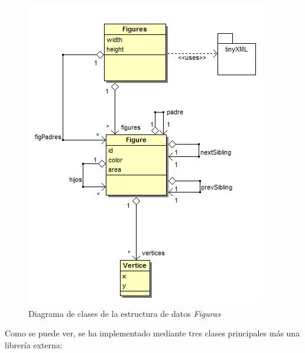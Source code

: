 		\begin{figure}[htbp]
		\centering
		\includegraphics[scale=0.60]{graphics/diagramaClasesFigure.png}
		\caption{Diagrama de clases de la estructura de datos \emph{Figuras}}
		\label{fig:diagramaClasesFigure}
		\end{figure}
		
	Como se puede ver, se ha implementado mediante tres clases principales más una librería externa:
	
